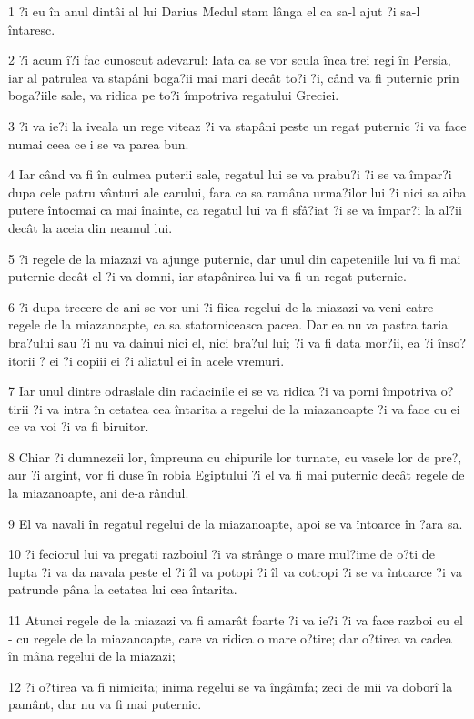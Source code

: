 \par 1 ?i eu în anul dintâi al lui Darius Medul stam lânga el ca sa-l ajut ?i sa-l întaresc.
\par 2 ?i acum î?i fac cunoscut adevarul: Iata ca se vor scula înca trei regi în Persia, iar al patrulea va stapâni boga?ii mai mari decât to?i ?i, când va fi puternic prin boga?iile sale, va ridica pe to?i împotriva regatului Greciei.
\par 3 ?i va ie?i la iveala un rege viteaz ?i va stapâni peste un regat puternic ?i va face numai ceea ce i se va parea bun.
\par 4 Iar când va fi în culmea puterii sale, regatul lui se va prabu?i ?i se va împar?i dupa cele patru vânturi ale carului, fara ca sa ramâna urma?ilor lui ?i nici sa aiba putere întocmai ca mai înainte, ca regatul lui va fi sfâ?iat ?i se va împar?i la al?ii decât la aceia din neamul lui.
\par 5 ?i regele de la miazazi va ajunge puternic, dar unul din capeteniile lui va fi mai puternic decât el ?i va domni, iar stapânirea lui va fi un regat puternic.
\par 6 ?i dupa trecere de ani se vor uni ?i fiica regelui de la miazazi va veni catre regele de la miazanoapte, ca sa statorniceasca pacea. Dar ea nu va pastra taria bra?ului sau ?i nu va dainui nici el, nici bra?ul lui; ?i va fi data mor?ii, ea ?i înso?itorii ? ei ?i copiii ei ?i aliatul ei în acele vremuri.
\par 7 Iar unul dintre odraslale din radacinile ei se va ridica ?i va porni împotriva o?tirii ?i va intra în cetatea cea întarita a regelui de la miazanoapte ?i va face cu ei ce va voi ?i va fi biruitor.
\par 8 Chiar ?i dumnezeii lor, împreuna cu chipurile lor turnate, cu vasele lor de pre?, aur ?i argint, vor fi duse în robia Egiptului ?i el va fi mai puternic decât regele de la miazanoapte, ani de-a rândul.
\par 9 El va navali în regatul regelui de la miazanoapte, apoi se va întoarce în ?ara sa.
\par 10 ?i feciorul lui va pregati razboiul ?i va strânge o mare mul?ime de o?ti de lupta ?i va da navala peste el ?i îl va potopi ?i îl va cotropi ?i se va întoarce ?i va patrunde pâna la cetatea lui cea întarita.
\par 11 Atunci regele de la miazazi va fi amarât foarte ?i va ie?i ?i va face razboi cu el - cu regele de la miazanoapte, care va ridica o mare o?tire; dar o?tirea va cadea în mâna regelui de la miazazi;
\par 12 ?i o?tirea va fi nimicita; inima regelui se va îngâmfa; zeci de mii va doborî la pamânt, dar nu va fi mai puternic.
